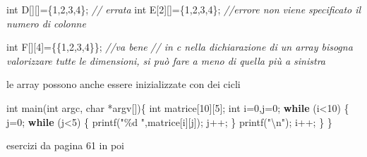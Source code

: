 \documentclass[
  paper=a4,
  oneside  ,captions=tableheading
]{scrbook}
\newenvironment{Shaded}{}{}
\newcommand{\CommentTok}[1]{\textcolor[rgb]{0.38,0.63,0.69}{\textit{#1}}}
\newcommand{\ControlFlowTok}[1]{\textcolor[rgb]{0.00,0.44,0.13}{\textbf{#1}}}
\newcommand{\DataTypeTok}[1]{\textcolor[rgb]{0.56,0.13,0.00}{#1}}
\newcommand{\DecValTok}[1]{\textcolor[rgb]{0.25,0.63,0.44}{#1}}
\newcommand{\NormalTok}[1]{#1}
\newcommand{\SpecialCharTok}[1]{\textcolor[rgb]{0.25,0.44,0.63}{#1}}
\newcommand{\StringTok}[1]{\textcolor[rgb]{0.25,0.44,0.63}{#1}}
\begin{document}
\begin{Shaded}
\begin{Highlighting}[]
\DataTypeTok{int}\NormalTok{ D[][]=\{}\DecValTok{1}\NormalTok{,}\DecValTok{2}\NormalTok{,}\DecValTok{3}\NormalTok{,}\DecValTok{4}\NormalTok{\}; }\CommentTok{// errata}
\DataTypeTok{int}\NormalTok{ E[}\DecValTok{2}\NormalTok{][]=\{}\DecValTok{1}\NormalTok{,}\DecValTok{2}\NormalTok{,}\DecValTok{3}\NormalTok{,}\DecValTok{4}\NormalTok{\}; }\CommentTok{//errore non viene specificato il numero di colonne}

\DataTypeTok{int}\NormalTok{ F[][}\DecValTok{4}\NormalTok{]=\{\{}\DecValTok{1}\NormalTok{,}\DecValTok{2}\NormalTok{,}\DecValTok{3}\NormalTok{,}\DecValTok{4}\NormalTok{\}\}; }\CommentTok{//va bene }
\CommentTok{// in c nella dichiarazione di un array bisogna valorizzare tutte le dimensioni, si può fare a meno di quella più a sinistra }
\end{Highlighting}
\end{Shaded}

le array possono anche essere inizializzate con dei cicli

\begin{Shaded}
\begin{Highlighting}[]
\DataTypeTok{int}\NormalTok{ main(}\DataTypeTok{int}\NormalTok{ argc, }\DataTypeTok{char}\NormalTok{ *argv[])\{}
    \DataTypeTok{int}\NormalTok{ matrice[}\DecValTok{10}\NormalTok{][}\DecValTok{5}\NormalTok{];}
    \DataTypeTok{int}\NormalTok{ i=}\DecValTok{0}\NormalTok{,j=}\DecValTok{0}\NormalTok{;}
    \ControlFlowTok{while}\NormalTok{ (i\textless{}}\DecValTok{10}\NormalTok{)}
\NormalTok{    \{}
\NormalTok{        j=}\DecValTok{0}\NormalTok{;}
        \ControlFlowTok{while}\NormalTok{ (j\textless{}}\DecValTok{5}\NormalTok{)}
\NormalTok{        \{}
\NormalTok{            printf(}\StringTok{"}\SpecialCharTok{\%d}\StringTok{ "}\NormalTok{,matrice[i][j]);}
\NormalTok{            j++;}
\NormalTok{        \}}
\NormalTok{        printf(}\StringTok{"}\SpecialCharTok{\textbackslash{}n}\StringTok{"}\NormalTok{);}
\NormalTok{        i++;}
\NormalTok{    \}}
\NormalTok{\}}
\end{Highlighting}
\end{Shaded}

esercizi da pagina 61 in poi
\end{document}
